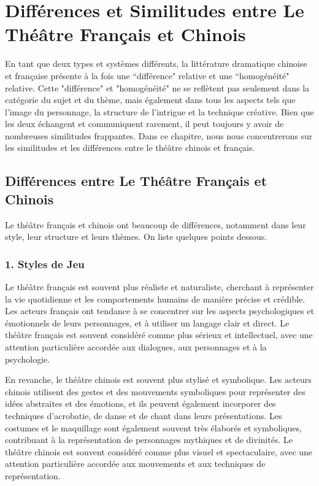 \documentclass[UTF8,a4paper,12pt]{ctexart}
\numberwithin{equation}{section}
\newcommand{\mycite}[1]{\cite{#1}}
\begin{document}
\section{Différences et Similitudes entre Le Théâtre Français et Chinois} \label{sec:role}
\hspace{8mm}
En tant que deux types et systèmes différents, la littérature dramatique chinoise et française présente à la fois une ``différence" relative et une ``homogénéité" relative. Cette "différence" et "homogénéité" ne se reflètent pas seulement dans la catégorie du sujet et du thème, mais également dans tous les aspects tels que l'image du personnage, la structure de l'intrigue et la technique créative. Bien que les deux échangent et communiquent rarement, il peut toujours y avoir de nombreuses similitudes frappantes. Dans ce chapitre, nous nous concentrerons sur les similitudes et les différences entre le théâtre chinois et français.

\subsection{Différences entre Le Théâtre Français et Chinois}
Le théâtre français et chinois ont beaucoup de  différences, notamment dans leur style, leur structure et leurs thèmes. On liste quelques points dessous.
\subsubsection*{1. Styles de Jeu}
Le théâtre français est souvent plus réaliste et naturaliste, cherchant à représenter la vie quotidienne et les comportements humains de manière précise et crédible. Les acteurs français ont tendance à se concentrer sur les aspects psychologiques et émotionnels de leurs personnages, et à utiliser un langage clair et direct. Le théâtre français est souvent considéré comme plus sérieux et intellectuel, avec une attention particulière accordée aux dialogues, aux personnages et à la psychologie\mycite{99}.

En revanche, le théâtre chinois est souvent plus stylisé et symbolique. Les acteurs chinois utilisent des gestes et des mouvements symboliques pour représenter des idées abstraites et des émotions, et ils peuvent également incorporer des techniques d'acrobatie, de danse et de chant dans leurs présentations. Les costumes et le maquillage sont également souvent très élaborés et symboliques, contribuant à la représentation de personnages mythiques et de divinités. Le théâtre chinois est souvent considéré comme plus visuel et spectaculaire, avec une attention particulière accordée aux mouvements et aux techniques de représentation.
\end{document}
